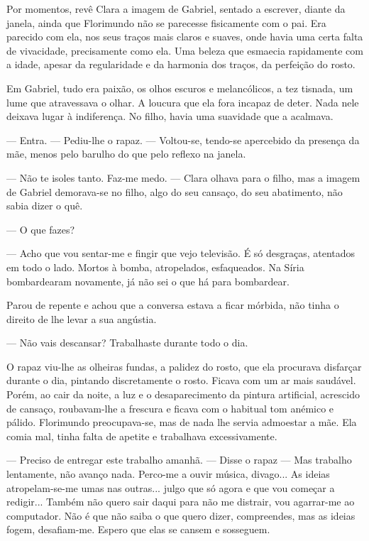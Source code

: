 Por momentos, revê Clara a imagem de Gabriel, sentado a escrever, diante
da janela, ainda que Florimundo não se parecesse fisicamente com o pai.
Era parecido com ela, nos seus traços mais claros e suaves, onde havia
uma certa falta de vivacidade, precisamente como ela. Uma beleza que
esmaecia rapidamente com a idade, apesar da regularidade e da harmonia
dos traços, da perfeição do rosto.

Em Gabriel, tudo era paixão, os olhos escuros e melancólicos, a tez
tisnada, um lume que atravessava o olhar. A loucura que ela fora incapaz
de deter. Nada nele deixava lugar à indiferença. No filho, havia uma
suavidade que a acalmava.

--- Entra. --- Pediu-lhe o rapaz. --- Voltou-se, tendo-se apercebido da
presença da mãe, menos pelo barulho do que pelo reflexo na janela.

--- Não te isoles tanto. Faz-me medo. --- Clara olhava para o filho, mas a
imagem de Gabriel demorava-se no filho, algo do seu cansaço, do seu
abatimento, não sabia dizer o quê.

--- O que fazes?

--- Acho que vou sentar-me e fingir que vejo televisão. É só desgraças,
atentados em todo o lado. Mortos à bomba, atropelados, esfaqueados. Na
Síria bombardearam novamente, já não sei o que há para bombardear.

Parou de repente e achou que a conversa estava a ficar mórbida, não
tinha o direito de lhe levar a sua angústia.

--- Não vais descansar? Trabalhaste durante todo o dia.

O rapaz viu-lhe as olheiras fundas, a palidez do rosto, que ela
procurava disfarçar durante o dia, pintando discretamente o rosto.
Ficava com um ar mais saudável. Porém, ao cair da noite, a luz e o
desaparecimento da pintura artificial, acrescido de cansaço,
roubavam-lhe a frescura e ficava com o habitual tom anémico e pálido.
Florimundo preocupava-se, mas de nada lhe servia admoestar a mãe. Ela
comia mal, tinha falta de apetite e trabalhava excessivamente.

--- Preciso de entregar este trabalho amanhã. ---  Disse o rapaz --- Mas
trabalho lentamente, não avanço nada. Perco-me a ouvir música, divago...
As ideias atropelam-se-me umas nas outras... julgo que só agora e que
vou começar a redigir... Também não quero sair daqui para não me
distrair, vou agarrar-me ao computador. Não é que não saiba o que quero
dizer, compreendes, mas as ideias fogem, desafiam-me. Espero que elas se
cansem e sosseguem.

